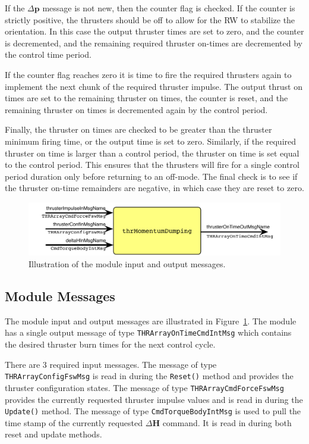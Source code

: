 \documentclass[]{BasiliskReportMemo}
\begin{document}
If the $\Delta\bm p$ message is not new, then the counter flag is checked.  If the counter is strictly positive, the thrusters should be off to allow for the RW to stabilize the orientation.  In this case the output thruster times are set to zero, and the counter is decremented, and the remaining required thruster on-times are decremented by the control time period.

If the counter flag reaches zero it is time to fire the required thrusters again to implement the next chunk of the required thruster impulse.  The output thrust on times are set to the remaining thruster on times, the counter is reset, and the remaining thruster on times is decremented again by the control period.

Finally, the thruster on times are checked to be greater than the thruster minimum firing time, or the output time is set to zero.  Similarly, if the required thruster on time is larger than a control period, the thruster on time is set equal to the control period.  This ensures that the thrusters will fire for a single control period duration only before returning to an off-mode.  The final check is to see if the thruster on-time remainders are negative, in which case they are reset to zero.



\begin{figure}[h]
	\centerline{
		\includegraphics{Figures/moduleImg}
	}
	\caption{Illustration of the module input and output messages.}
	\label{fig:moduleImg}
\end{figure}





\subsection{Module Messages}
The module input and output messages are illustrated in Figure~\ref{fig:moduleImg}.  The module has a single output message of type {\tt THRArrayOnTimeCmdIntMsg} which contains the desired thruster burn times for the next control cycle.

There are 3 required input messages.  The message of type {\tt THRArrayConfigFswMsg} is read in during the {\tt Reset()} method and provides the thruster configuration states.  The message of type {\tt THRArrayCmdForceFswMsg} provides the currently requested thruster impulse values and is read in during the {\tt Update()} method.  The message of type {\tt CmdTorqueBodyIntMsg} is used to pull the time stamp of the currently requested $\Delta {\bm H}$ command.  It is read in during both reset and update methods.  
\end{document}
